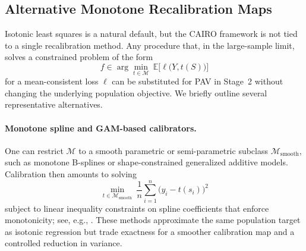 \documentclass[11pt]{article}
\theoremstyle{plain}
\theoremstyle{plain}
\theoremstyle{plain}
\theoremstyle{plain}
\theoremstyle{plain}
\theoremstyle{plain}
\theoremstyle{plain}
\begin{document}




 
\iffalse
\subsection{Alternative Monotone Recalibration Maps}
\label{sec:alt-calibration}

Isotonic least squares is a natural default, but the \textsc{CAIRO} framework is not tied to a single recalibration method.  
Any procedure that, in the large-sample limit, solves a constrained problem of the form
\[
f \in \arg\min_{t\in\mathcal M} \ \mathbb{E}\big[\ell\big(Y,t(S)\big)\big]
\]
for a mean-consistent loss $\ell$ can be substituted for PAV in Stage~2 without changing the underlying population objective.  
We briefly outline several representative alternatives.

\paragraph{Monotone spline and GAM-based calibrators.}
One can restrict $\mathcal M$ to a smooth parametric or semi-parametric subclass $\mathcal M_{\mathrm{smooth}}$, such as monotone B-splines or shape-constrained generalized additive models.  
Calibration then amounts to solving
\[
\min_{t\in\mathcal M_{\mathrm{smooth}}}\ \frac{1}{n}\sum_{i=1}^n \big(y_i-t(s_i)\big)^2
\]
subject to linear inequality constraints on spline coefficients that enforce monotonicity; see, e.g., \citet{meyer2008inference,scheipl2016generalized}.  
These methods approximate the same population target as isotonic regression but trade exactness for a smoother calibration map and a controlled reduction in variance.
\end{document}
